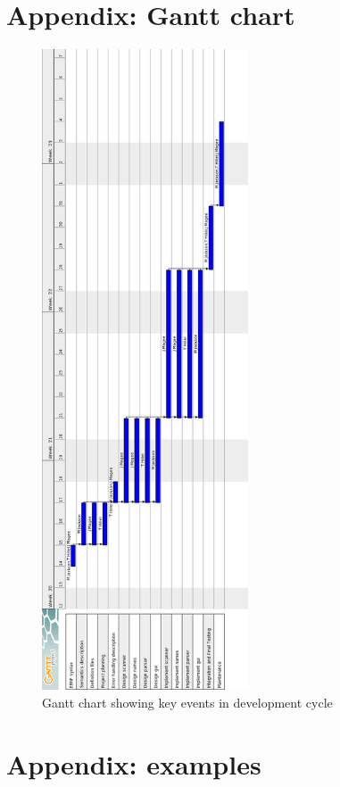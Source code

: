 \documentclass[a4paper,10pt]{article}
\begin{document}
\section{Appendix: Gantt chart}
\begin{figure}[h]
 \centering
  \includegraphics[height=19cm]{Gantt-Chart.png}
 \caption{Gantt chart showing key events in development cycle}
 \label{fig:ganttchart}
\end{figure}

\clearpage

\section{Appendix: examples}
\end{document}
